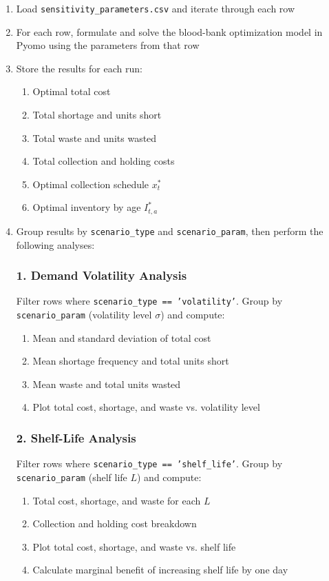 \documentclass{KPS_assignment}
\begin{document}
\begin{enumerate}
    \item Load \texttt{sensitivity\_parameters.csv} and iterate through each row
    \item For each row, formulate and solve the blood-bank optimization model in Pyomo using the parameters from that row
    \item Store the results for each run:
    \begin{enumerate}
        \item Optimal total cost
        \item Total shortage and units short
        \item Total waste and units wasted
        \item Total collection and holding costs
        \item Optimal collection schedule $x_t^*$
        \item Optimal inventory by age $I_{t,a}^*$
    \end{enumerate}
    \item Group results by \texttt{scenario\_type} and \texttt{scenario\_param}, then perform the following analyses:
    
    \subsubsection*{1. Demand Volatility Analysis}
    
    Filter rows where \texttt{scenario\_type == 'volatility'}. Group by \texttt{scenario\_param} (volatility level $\sigma$) and compute:
    \begin{enumerate}
        \item Mean and standard deviation of total cost
        \item Mean shortage frequency and total units short
        \item Mean waste and total units wasted
        \item Plot total cost, shortage, and waste vs. volatility level
    \end{enumerate}
    
    \subsubsection*{2. Shelf-Life Analysis}
    
    Filter rows where \texttt{scenario\_type == 'shelf\_life'}. Group by \texttt{scenario\_param} (shelf life $L$) and compute:
    \begin{enumerate}
        \item Total cost, shortage, and waste for each $L$
        \item Collection and holding cost breakdown
        \item Plot total cost, shortage, and waste vs. shelf life
        \item Calculate marginal benefit of increasing shelf life by one day
    \end{enumerate}
    

\end{enumerate}
\end{document}
